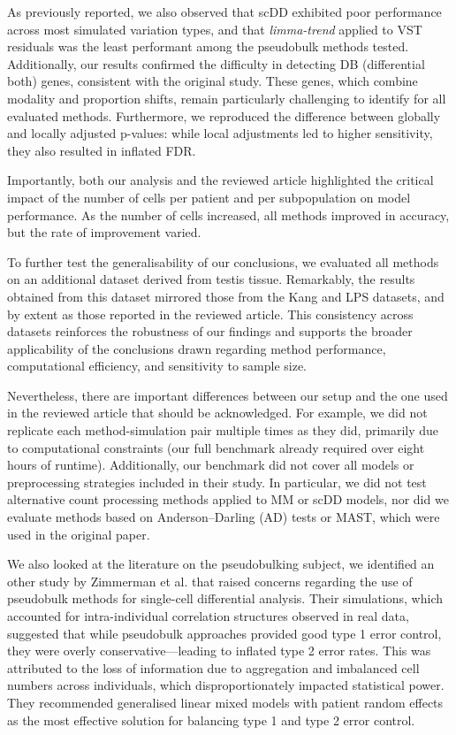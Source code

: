 \documentclass[a4paper, 11pt, twocolumn]{article}
\begin{document}
\begin{multicols}{2}
As previously reported, we also observed that scDD exhibited poor performance across most simulated variation types, and that \textit{limma-trend} applied to VST residuals was the least performant among the pseudobulk methods tested. Additionally, our results confirmed the difficulty in detecting DB (differential both) genes, consistent with the original study. These genes, which combine modality and proportion shifts, remain particularly challenging to identify for all evaluated methods. Furthermore, we reproduced the difference between globally and locally adjusted p-values: while local adjustments led to higher sensitivity, they also resulted in inflated FDR.

Importantly, both our analysis and the reviewed article highlighted the critical impact of the number of cells per patient and per subpopulation on model performance. As the number of cells increased, all methods improved in accuracy, but the rate of improvement varied.

To further test the generalisability of our conclusions, we evaluated all methods on an additional dataset derived from testis tissue. Remarkably, the results obtained from this dataset mirrored those from the Kang and LPS datasets, and by extent as those reported in the reviewed article. This consistency across datasets reinforces the robustness of our findings and supports the broader applicability of the conclusions drawn regarding method performance, computational efficiency, and sensitivity to sample size.

Nevertheless, there are important differences between our setup and the one used in the reviewed article that should be acknowledged. For example, we did not replicate each method-simulation pair multiple times as they did, primarily due to computational constraints (our full benchmark already required over eight hours of runtime). Additionally, our benchmark did not cover all models or preprocessing strategies included in their study. In particular, we did not test alternative count processing methods applied to MM or scDD models, nor did we evaluate methods based on Anderson–Darling (AD) tests or MAST, which were used in the original paper.

We also looked at the literature on the pseudobulking subject, we identified an other study by Zimmerman et al. \citep{zimmerman2021practical} that raised concerns regarding the use of pseudobulk methods for single-cell differential analysis. Their simulations, which accounted for intra-individual correlation structures observed in real data, suggested that while pseudobulk approaches provided good type 1 error control, they were overly conservative—leading to inflated type 2 error rates. This was attributed to the loss of information due to aggregation and imbalanced cell numbers across individuals, which disproportionately impacted statistical power. They recommended generalised linear mixed models  with patient random effects as the most effective solution for balancing type 1 and type 2 error control.


\end{multicols}
\end{document}
